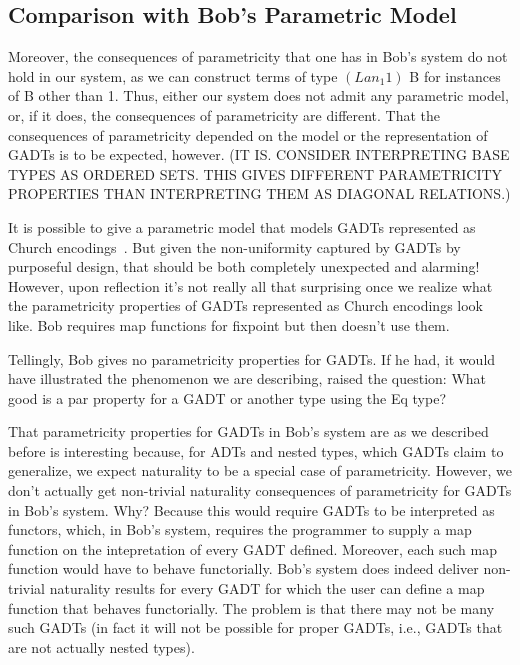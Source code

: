 \documentclass[acmsmall,screen,review,anonymous]{acmart}
\theoremstyle{definition}
\begin{document}
\subsection{Comparison with Bob's Parametric Model}

Moreover, the consequences of parametricity that one has in Bob's
system do not hold in our system, as we can construct terms of type
$(Lan_1 1)$ B for instances of B other than 1.  Thus, either our
system does not admit any parametric model, or, if it does, the
consequences of parametricity are different.  That the consequences of
parametricity depended on the model or the representation of GADTs is
to be expected, however. (IT IS. CONSIDER INTERPRETING BASE TYPES AS
ORDERED SETS. THIS GIVES DIFFERENT PARAMETRICITY PROPERTIES THAN
INTERPRETING THEM AS DIAGONAL RELATIONS.)

It is possible to give a parametric model that models GADTs
represented as Church encodings~\cite{atk12}.  But given the
non-uniformity captured by GADTs by purposeful design, that should be
both completely unexpected and alarming! However, upon reflection it's
not really all that surprising once we realize what the parametricity
properties of GADTs represented as Church encodings look like. Bob
requires map functions for fixpoint but then doesn't use them.

Tellingly, Bob gives no parametricity properties for GADTs. If he had,
it would have illustrated the phenomenon we are describing, raised the
question: What good is a par property for a GADT or another type using
the Eq type?

That parametricity properties for GADTs in Bob's system are as we
described before is interesting because, for ADTs and nested types,
which GADTs claim to generalize, we expect naturality to be a special
case of parametricity. However, we don't actually get non-trivial
naturality consequences of parametricity for GADTs in Bob's
system. Why? Because this would require GADTs to be interpreted as
functors, which, in Bob's system, requires the programmer to supply a
map function on the intepretation of every GADT defined. Moreover,
each such map function would have to behave functorially. Bob's system
does indeed deliver non-trivial naturality results for every GADT for
which the user can define a map function that behaves
functorially. The problem is that there may not be many such GADTs (in
fact it will not be possible for proper GADTs, i.e., GADTs that are
not actually nested types).
\end{document}
